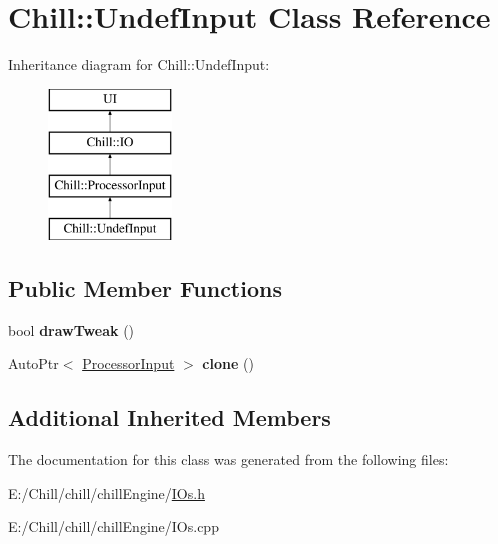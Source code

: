 \hypertarget{class_chill_1_1_undef_input}{}\section{Chill\+:\+:Undef\+Input Class Reference}
\label{class_chill_1_1_undef_input}
Inheritance diagram for Chill\+:\+:Undef\+Input\+:\begin{figure}[H]
\begin{center}
\leavevmode
\includegraphics[height=4.000000cm]{class_chill_1_1_undef_input}
\end{center}
\end{figure}
\subsection*{Public Member Functions}
\begin{DoxyCompactItemize}
\item 
\mbox{\label{class_chill_1_1_undef_input_a09536f796e0151b75d66114c1dc8960d}} 
bool {\bfseries draw\+Tweak} ()
\item 
\mbox{\label{class_chill_1_1_undef_input_a066afdd58b9cc04b2b94375bc20c5209}} 
Auto\+Ptr$<$ \mbox{\hyperlink{class_chill_1_1_processor_input}{Processor\+Input}} $>$ {\bfseries clone} ()
\end{DoxyCompactItemize}
\subsection*{Additional Inherited Members}


The documentation for this class was generated from the following files\+:\begin{DoxyCompactItemize}
\item 
E\+:/\+Chill/chill/chill\+Engine/\mbox{\hyperlink{_i_os_8h}{I\+Os.\+h}}\item 
E\+:/\+Chill/chill/chill\+Engine/I\+Os.\+cpp\end{DoxyCompactItemize}
